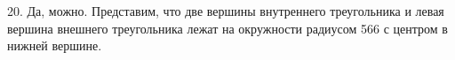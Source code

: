 20. Да, можно. Представим, что две вершины внутреннего треугольника и левая вершина внешнего треугольника лежат на окружности радиусом 566 с центром в нижней вершине.
\begin{figure}[ht!]
\end{figure}\newpage\noindent
